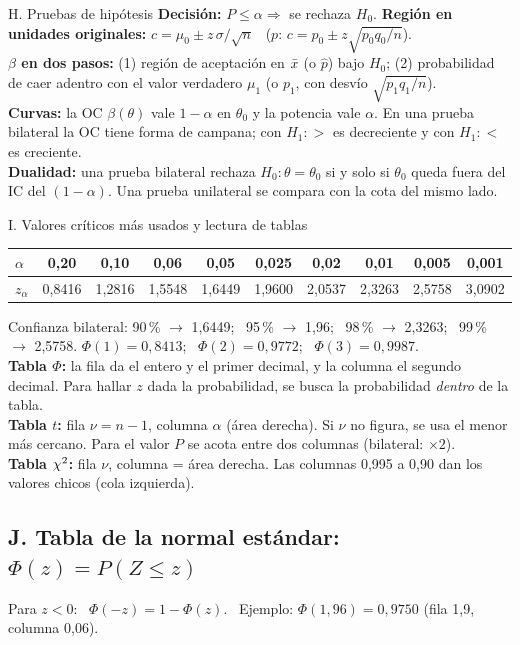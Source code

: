 {\begin{hoja}{H. Pruebas de hipótesis}
\smallskip
\textbf{Decisión:} $P\le\alpha\Rightarrow$ se rechaza $H_0$. \quad \textbf{Región en unidades originales:} $c=\mu_0\pm z\,\sigma/\sqrt n$ \ ($p$: $c=p_0\pm z\sqrt{p_0q_0/n}$).\\
\textbf{$\beta$ en dos pasos:} (1) región de aceptación en $\bar{x}$ (o $\hat p$) bajo $H_0$; (2) probabilidad de caer adentro con el valor verdadero $\mu_1$ (o $p_1$, con desvío $\sqrt{p_1q_1/n}$).\\
\textbf{Curvas:} la OC $\beta(\theta)$ vale $1-\alpha$ en $\theta_0$ y la potencia vale $\alpha$. En una prueba bilateral la OC tiene forma de campana; con $H_1:>$ es decreciente y con $H_1:<$ es creciente.\\
\textbf{Dualidad:} una prueba bilateral rechaza $H_0:\theta=\theta_0$ si y solo si $\theta_0$ queda fuera del IC del $(1-\alpha)$. Una prueba unilateral se compara con la cota del mismo lado.
\end{hoja}

\begin{hoja}[unbreakable]{I. Valores críticos más usados y lectura de tablas}
\raggedright
\renewcommand{\arraystretch}{1.15}
\begin{tabular}{@{}lccccccccc@{}}
\toprule
$\alpha$ & 0,20 & 0,10 & 0,06 & 0,05 & 0,025 & 0,02 & 0,01 & 0,005 & 0,001\\\midrule
$z_\alpha$ & 0,8416 & 1,2816 & 1,5548 & 1,6449 & 1,9600 & 2,0537 & 2,3263 & 2,5758 & 3,0902\\\bottomrule
\end{tabular}

\smallskip
Confianza bilateral: 90\,\% $\to$ 1,6449; \ 95\,\% $\to$ 1,96; \ 98\,\% $\to$ 2,3263; \ 99\,\% $\to$ 2,5758. \quad
$\Phi(1)=0{,}8413$; \ $\Phi(2)=0{,}9772$; \ $\Phi(3)=0{,}9987$.\\
\textbf{Tabla $\Phi$:} la fila da el entero y el primer decimal, y la columna el segundo decimal. Para hallar $z$ dada la probabilidad, se busca la probabilidad \emph{dentro} de la tabla.\\
\textbf{Tabla $t$:} fila $\nu=n-1$, columna $\alpha$ (área derecha). Si $\nu$ no figura, se usa el menor más cercano. Para el valor $P$ se acota entre dos columnas (bilateral: $\times2$).\\
\textbf{Tabla $\chi^2$:} fila $\nu$, columna = área derecha. Las columnas 0,995 a 0,90 dan los valores chicos (cola izquierda).
\end{hoja}
}

\subsection*{J. Tabla de la normal estándar: \ $\Phi(z)=P(Z\le z)$}
Para $z<0$: \ $\Phi(-z)=1-\Phi(z)$. \ Ejemplo: $\Phi(1{,}96)=0{,}9750$ (fila 1,9, columna 0,06).
\begin{center}
\footnotesize\setlength{\tabcolsep}{4.2pt}\renewcommand{\arraystretch}{0.95}

\end{center}

